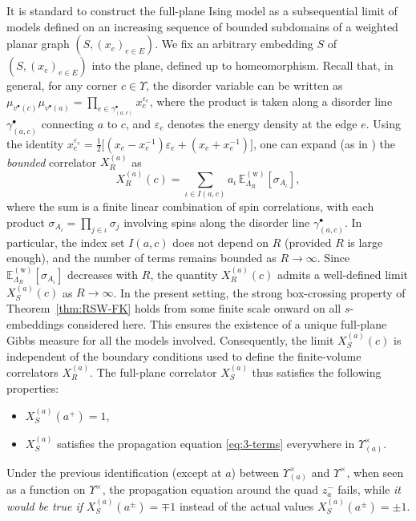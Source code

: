 \documentclass[reqno]{amsart}
\numberwithin{equation}{section}
\theoremstyle{definition}
\theoremstyle{remark}
\begin{document}
It is standard to construct the full-plane Ising model as a subsequential limit of models defined on an increasing sequence of bounded subdomains of a weighted planar graph $(S, (x_e)_{e \in E})$. We fix an arbitrary embedding $S$ of $(S, (x_e)_{e \in E})$ into the plane, defined up to homeomorphism. Recall that, in general, for any corner $c \in \Upsilon$, the disorder variable can be written as $\mu_{v^\bullet(c)} \mu_{v^\bullet(a)} = \prod_{e \in \gamma^\bullet_{(a,c)}} x_e^{\varepsilon_e}$, where the product is taken along a disorder line $\gamma^\bullet_{(a,c)}$ connecting $a$ to $c$, and $\varepsilon_e$ denotes the energy density at the edge $e$. Using the identity $x_e^{\varepsilon_e} = \tfrac{1}{2}\big[(x_e - x_e^{-1})\varepsilon_e + (x_e + x_e^{-1})\big]$, one can expand (as in \cite[Lemma~4.1]{Cim-universality}) the \emph{bounded} correlator $X_{R}^{(a)}$ as
\begin{equation}
    X_{R}^{(a)}(c) = \sum_{\iota \in I(a,c)} a_{\iota}\,
    \mathbb{E}^{\mathrm{(w)}}_{\Lambda_R}[\sigma_{A_\iota}],
\end{equation}
where the sum is a finite linear combination of spin correlations, with each product $\sigma_{A_\iota} = \prod_{j \in \iota} \sigma_j$ involving spins along the disorder line $\gamma^\bullet_{(a,c)}$. In particular, the index set $I(a,c)$ does not depend on $R$ (provided $R$ is large enough), and the number of terms remains bounded as $R \to \infty$. Since $\mathbb{E}^{\mathrm{(w)}}_{\Lambda_R}[\sigma_{A_\iota}]$ decreases with $R$, the quantity $X_{R}^{(a)}(c)$ admits a well-defined limit $X_{S}^{(a)}(c)$ as $R \to \infty$. In the present setting, the strong box-crossing property of Theorem~\ref{thm:RSW-FK} holds from some finite scale onward on all $s$-embeddings considered here. This ensures the existence of a unique full-plane Gibbs measure for all the models involved. Consequently, the limit $X_{S}^{(a)}(c)$ is independent of the boundary conditions used to define the finite-volume correlators $X_{R}^{(a)}$. The full-plane correlator $X_{S}^{(a)}$ thus satisfies the following properties:

\begin{itemize}
\item $X_{S}^{(a)}(a^+)=1$,
\item $X_{S}^{(a)}$ satisfies the propagation equation \eqref{eq:3-terms} everywhere in $\Upsilon^{\times}_{(a)} $.
\end{itemize}
Under the previous identification (except at $a$) between $\Upsilon^{\times}_{(a)} $ and $\Upsilon^{\times}$, when seen as a function on $\Upsilon^{\times}$, the propagation equation around the quad $z^{-}_{a}$ fails, while \emph{it would be true if} $X_{S}^{(a)}(a^\pm)=\mp 1 $ instead of the actual values $X_{S}^{(a)}(a^\pm)=\pm 1 $.
\end{document}
